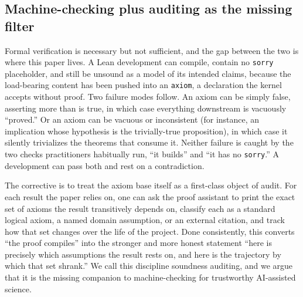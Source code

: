 \documentclass[11pt]{article}
\begin{document}
\subsection{Machine-checking plus auditing as the missing filter}

Formal verification is necessary but not sufficient, and the gap between the two is where this
paper lives. A Lean development can compile, contain no \texttt{sorry} placeholder, and still be
unsound as a model of its intended claims, because the load-bearing content has been pushed into an
\texttt{axiom}, a declaration the kernel accepts without proof. Two failure modes follow. An axiom
can be simply false, asserting more than is true, in which case everything downstream is vacuously
``proved.'' Or an axiom can be vacuous or inconsistent (for instance, an implication whose
hypothesis is the trivially-true proposition), in which case it silently trivializes the theorems
that consume it. Neither failure is caught by the two checks practitioners habitually run, ``it
builds'' and ``it has no \texttt{sorry}.'' A development can pass both and rest on a contradiction.

The corrective is to treat the axiom base itself as a first-class object of audit. For each result
the paper relies on, one can ask the proof assistant to print the exact set of axioms the result
transitively depends on, classify each as a standard logical axiom, a named domain assumption, or
an external citation, and track how that set changes over the life of the project. Done
consistently, this converts ``the proof compiles'' into the stronger and more honest statement
``here is precisely which assumptions the result rests on, and here is the trajectory by which that
set shrank.'' We call this discipline soundness auditing, and we argue that it is the missing
companion to machine-checking for trustworthy AI-assisted science.

\begin{center}
\end{center}
\end{document}
